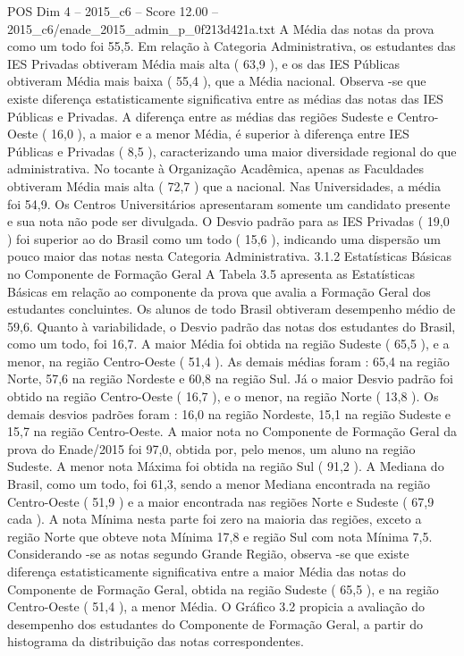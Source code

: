 \begin{textsample}{POS Dim 4 – 2015\_c6 – Score 12.00 – 2015\_c6/enade\_2015\_admin\_p\_0f213d421a.txt}
A Média das notas da prova como um todo foi 55,5.
Em relação à Categoria Administrativa, os estudantes das IES Privadas obtiveram Média mais alta ( 63,9 ), e os das IES Públicas obtiveram Média mais baixa ( 55,4 ), que a Média nacional.
Observa -se que existe diferença estatisticamente significativa entre as médias das notas das IES Públicas e Privadas.
A diferença entre as médias das regiões Sudeste e Centro-Oeste ( 16,0 ), a maior e a menor Média, é superior à diferença entre IES Públicas e Privadas ( 8,5 ), caracterizando uma maior diversidade regional do que administrativa.
No tocante à Organização Acadêmica, apenas as Faculdades obtiveram Média mais alta ( 72,7 ) que a nacional.
Nas Universidades, a média foi 54,9.
Os Centros Universitários apresentaram somente um candidato presente e sua nota não pode ser divulgada.
O Desvio padrão para as IES Privadas ( 19,0 ) foi superior ao do Brasil como um todo ( 15,6 ), indicando uma dispersão um pouco maior das notas nesta Categoria Administrativa. 3.1.2 Estatísticas Básicas no Componente de Formação Geral A Tabela 3.5 apresenta as Estatísticas Básicas em relação ao componente da prova que avalia a Formação Geral dos estudantes concluintes.
Os alunos de todo Brasil obtiveram desempenho médio de 59,6.
Quanto à variabilidade, o Desvio padrão das notas dos estudantes do Brasil, como um todo, foi 16,7.
A maior Média foi obtida na região Sudeste ( 65,5 ), e a menor, na região Centro-Oeste ( 51,4 ).
As demais médias foram : 65,4 na região Norte, 57,6 na região Nordeste e 60,8 na região Sul.
Já o maior Desvio padrão foi obtido na região Centro-Oeste ( 16,7 ), e o menor, na região Norte ( 13,8 ).
Os demais desvios padrões foram : 16,0 na região Nordeste, 15,1 na região Sudeste e 15,7 na região Centro-Oeste.
A maior nota no Componente de Formação Geral da prova do Enade/2015 foi 97,0, obtida por, pelo menos, um aluno na região Sudeste.
A menor nota Máxima foi obtida na região Sul ( 91,2 ).
A Mediana do Brasil, como um todo, foi 61,3, sendo a menor Mediana encontrada na região Centro-Oeste ( 51,9 ) e a maior encontrada nas regiões Norte e Sudeste ( 67,9 cada ).
A nota Mínima nesta parte foi zero na maioria das regiões, exceto a região Norte que obteve nota Mínima 17,8 e região Sul com nota Mínima 7,5.
Considerando -se as notas segundo Grande Região, observa -se que existe diferença estatisticamente significativa entre a maior Média das notas do Componente de Formação Geral, obtida na região Sudeste ( 65,5 ), e na região Centro-Oeste ( 51,4 ), a menor Média.
O Gráfico 3.2 propicia a avaliação do desempenho dos estudantes do Componente de Formação Geral, a partir do histograma da distribuição das notas correspondentes.

\end{textsample}

